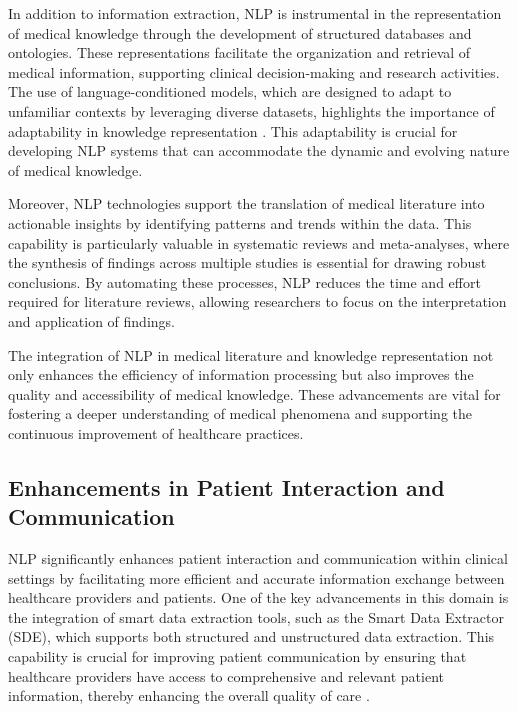 In addition to information extraction, NLP is instrumental in the representation of medical knowledge through the development of structured databases and ontologies. These representations facilitate the organization and retrieval of medical information, supporting clinical decision-making and research activities. The use of language-conditioned models, which are designed to adapt to unfamiliar contexts by leveraging diverse datasets, highlights the importance of adaptability in knowledge representation \cite{zhou2024languageconditionedimitationlearningbase}. This adaptability is crucial for developing NLP systems that can accommodate the dynamic and evolving nature of medical knowledge.



Moreover, NLP technologies support the translation of medical literature into actionable insights by identifying patterns and trends within the data. This capability is particularly valuable in systematic reviews and meta-analyses, where the synthesis of findings across multiple studies is essential for drawing robust conclusions. By automating these processes, NLP reduces the time and effort required for literature reviews, allowing researchers to focus on the interpretation and application of findings.



The integration of NLP in medical literature and knowledge representation not only enhances the efficiency of information processing but also improves the quality and accessibility of medical knowledge. These advancements are vital for fostering a deeper understanding of medical phenomena and supporting the continuous improvement of healthcare practices.



\subsection{Enhancements in Patient Interaction and Communication} \label{subsec:Enhancements in Patient Interaction and Communication}



NLP significantly enhances patient interaction and communication within clinical settings by facilitating more efficient and accurate information exchange between healthcare providers and patients. One of the key advancements in this domain is the integration of smart data extraction tools, such as the Smart Data Extractor (SDE), which supports both structured and unstructured data extraction. This capability is crucial for improving patient communication by ensuring that healthcare providers have access to comprehensive and relevant patient information, thereby enhancing the overall quality of care \cite{quennelle2023smartdataextractorclinician}.



